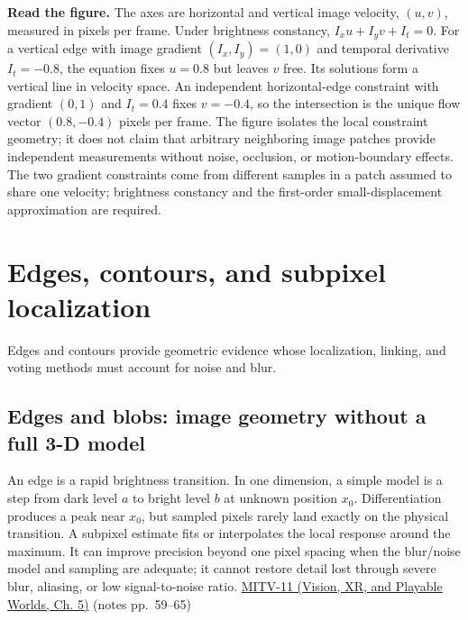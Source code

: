 \textbf{Read the figure.} The axes are horizontal and vertical image velocity, \((u,v)\), measured in pixels per frame. Under brightness constancy, \(I_xu+I_yv+I_t=0\). For a vertical edge with image gradient \((I_x,I_y)=(1,0)\) and temporal derivative \(I_t=-0.8\), the equation fixes \(u=0.8\) but leaves \(v\) free. Its solutions form a vertical line in velocity space. An independent horizontal-edge constraint with gradient \((0,1)\) and \(I_t=0.4\) fixes \(v=-0.4\), so the intersection is the unique flow vector \((0.8,-0.4)\) pixels per frame. The figure isolates the local constraint geometry; it does not claim that arbitrary neighboring image patches provide independent measurements without noise, occlusion, or motion-boundary effects. The two gradient constraints come from different samples in a patch assumed to share one velocity; brightness constancy and the first-order small-displacement approximation are required.

\section{Edges, contours, and subpixel localization}\label{04-visual-computing-ii-ch030-edges-contours-and-subpixel-localization}

\hypertarget{04-visual-computing-ii-ch030-edges-contours-and-subpixel-localization}{}

Edges and contours provide geometric evidence whose localization, linking, and voting methods must account for noise and blur.

\subsection{Edges and blobs: image geometry without a full 3-D model}\label{04-visual-computing-ii-ch030-edges-and-blobs-image-geometry-without-a-full-3-d-model}

\hypertarget{04-visual-computing-ii-ch030-edges-and-blobs-image-geometry-without-a-full-3-d-model}{}

An edge is a rapid brightness transition. In one dimension, a simple model is a step from dark level \(a\) to bright level \(b\) at unknown position \(x_0\). Differentiation produces a peak near \(x_0\), but sampled pixels rarely land exactly on the physical transition. A subpixel estimate fits or interpolates the local response around the maximum. It can improve precision beyond one pixel spacing when the blur/noise model and sampling are adequate; it cannot restore detail lost through severe blur, aliasing, or low signal-to-noise ratio. \href{../07-Vision-XR-and-Playable-Worlds/main.pdf\#nameddest=04-visual-computing-ii-ch036-mitv-11---edge-detection-subpixel-position-cordic-line-detection-us-6408109}{MITV-11 (Vision, XR, and Playable Worlds, Ch. 5)} (notes pp.~59--65)


